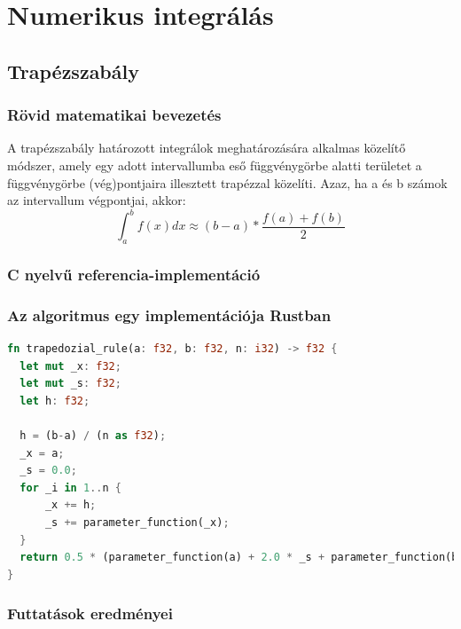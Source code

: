 
\section{Numerikus integrálás}

\subsection{Trapézszabály}
\subsubsection{Rövid matematikai bevezetés}
A trapézszabály határozott integrálok meghatározására alkalmas közelítő módszer, amely egy adott intervallumba eső függvénygörbe alatti területet a függvénygörbe (vég)pontjaira illesztett trapézzal közelíti. Azaz, ha a és b számok az intervallum végpontjai, akkor:
\[ \int_{a}^{b} f(x) dx \approx (b-a) * \frac{f(a) + f(b)}{2} \]
\subsubsection{C nyelvű referencia-implementáció}
\subsubsection{Az algoritmus egy implementációja Rustban}
\begin{lstlisting}[language=Rust, style=boxed]
fn trapedozial_rule(a: f32, b: f32, n: i32) -> f32 {
  let mut _x: f32;
  let mut _s: f32;
  let h: f32;
  
  h = (b-a) / (n as f32);
  _x = a;
  _s = 0.0;
  for _i in 1..n {
	  _x += h;
	  _s += parameter_function(_x);
  }
  return 0.5 * (parameter_function(a) + 2.0 * _s + parameter_function(b) );
}
\end{lstlisting}

\subsubsection{Futtatások eredményei}

